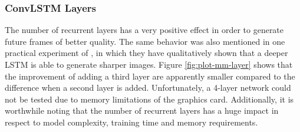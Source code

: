 \subsubsection*{ConvLSTM Layers}

The number of recurrent layers has a very positive effect in order to generate future frames of better quality. The same behavior was also mentioned in one practical experiment of \parencite[p. 6]{unsup_learn_lstm}, in which they have qualitatively shown that a deeper LSTM is able to generate sharper images. Figure \ref{fig:plot-mm-layer} shows that the improvement of adding a third layer are apparently smaller compared to the difference when a second layer is added. Unfortunately, a 4-layer network could not be tested due to memory limitations of the graphics card. Additionally, it is worthwhile noting that the number of recurrent layers has a huge impact in respect to model complexity, training time and memory requirements.

